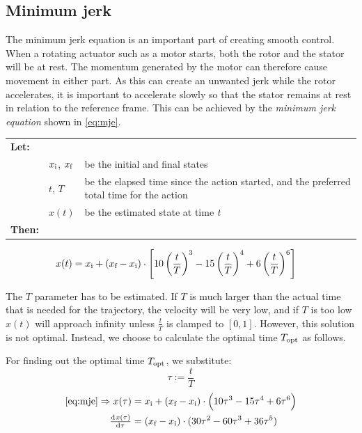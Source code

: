 \documentclass[11pt]{article}
\begin{document}
\subsection{Minimum jerk}
The minimum jerk equation is an important part of creating smooth control. When a rotating actuator such as a motor starts, both the rotor and the stator will be at rest. The momentum generated by the motor can therefore cause movement in either part. As this can create an unwanted jerk while the rotor accelerates, it is important to accelerate slowly so that the stator remains at rest in relation to the reference frame. This can be achieved by the \emph{minimum jerk equation} shown in \vref{eq:mje}.
\par \vspace{10pt}
{\footnotesize
  \begin{tabular}{l l l}
    \textbf{Let:} \\
 &$x_\textup{i}$, $x_\textup{f}$ &be the initial and final states\\
 &$t$, $T$ &be the elapsed time since the action started, and the preferred total time for the action  \\
 &$x(t)$ &be the estimated state at time \emph{t} \\
    \textbf{Then:}
  \end{tabular}
  \begin{align}
    x(t) &= x_\textup{i} +  (x_\textup{f} - x_\textup{i}) \cdot \left[10\left(\frac{t}{T}\right)^3 - 15\left(\frac{t}{T}\right)^4 + 6\left(\frac{t}{T}\right)^6 \right]\label{eq:mje}          
  \end{align}}
The $T$ parameter has to be estimated. If $T$ is much larger than  the actual time that is needed for the trajectory, the velocity will be very low, and if $T$ is too low $x(t)$ will approach infinity unless $\frac{t}{T}$ is clamped to $[0,1]$. However, this solution is not optimal. Instead, we choose to calculate the optimal time $T_\textup{opt}$ as follows.%
\par
For finding out the optimal time $T_\textup{opt}$, we substitute:
\begin{equation}
  \label{eq:tau_substitution}
  \tau:=\frac{t}{T}
\end{equation}
\vspace{-6mm}
\begin{align}
\ref{eq:mje}\Rightarrow x(\tau)&= \di{x}{i} +  (\di{x}{f} - \di{x}{i}) \cdot \left(10\tau^3 - 15\tau^4 + 6\tau^6 \right)\\
\od{x(\tau)}{\tau}&= (\di{x}{f} - \di{x}{i})\cdot(30\tau^2-60\tau^3+36\tau^5)\label{eq:dx_dtau}
\end{align}
\end{document}
